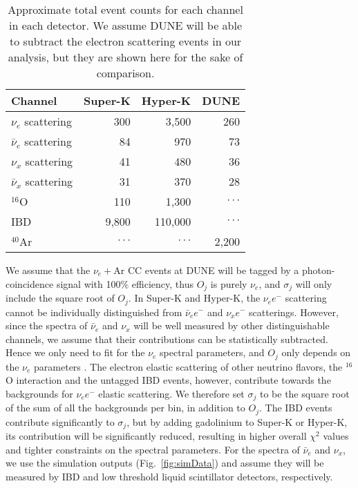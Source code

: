 \documentclass[aps,reprint,superscriptaddress]{revtex4-1}
\begin{document}
\begin{table}
\centering
\begin{tabular}{lrrr}
\hline \hline Channel & Super-K & Hyper-K & DUNE \\ 
\hline $\nu_{e}$ scattering & 300 & 3,500 & 260 \\
 $\bar{\nu}_{e}$ scattering & 84 & 970 & 73 \\
 $\nu_{x}$ scattering & 41 & 480 & 36 \\
 $\bar{\nu}_{x}$ scattering & 31 & 370 & 28 \\
 $^{16}\text{O}$ & 110 & 1,300 & $\cdot\cdot\cdot $\\
 IBD & 9,800 & 110,000 & $\cdot\cdot\cdot$ \\
 $^{40}\text{Ar}$ &$ \cdot\cdot\cdot$ & $\cdot\cdot\cdot$ & 2,200 \\
\hline \hline
\end{tabular}
\caption{Approximate total event counts for each channel in each detector. We assume DUNE will be able to subtract the electron scattering events in our analysis, but they are shown here for the sake of comparison.}
\label{tab:eventCounts}
\end{table}

We assume that the $\nu_e + \text{Ar}$ CC events at DUNE will be tagged by a photon-coincidence signal \cite{Ankowski:2016lab} with 100\% efficiency, thus $O_j$ is purely $\nu_e$, and $\sigma_{j}$ will only include the square root of $O_{j}$.  In Super-K and Hyper-K, the $\nu_{e}e^-$ scattering cannot be individually distinguished from $\bar{\nu}_{e}e^-$ and $\nu_{x}e^-$ scatterings.  However, since the spectra of $\bar{\nu}_e$ and $\nu_x$ will be well measured by other distinguishable channels, we assume that their contributions can be statistically subtracted. Hence we only need to fit for the $\nu_e$ spectral parameters, and $O_j$ only depends on the $\nu_e$ parameters \cite{Laha:2013hva}.  The electron elastic scattering of other neutrino flavors, the $^{16}$O interaction and the untagged IBD events, however, contribute towards the backgrounds for $\nu_{e}e^-$ elastic scattering.  We therefore set $\sigma_{j}$ to be the square root of the sum of all the backgrounds per bin, in addition to $O_{j}$.  The IBD events contribute significantly to $\sigma_{j}$, but by adding gadolinium to Super-K or Hyper-K, its contribution will be significantly reduced, resulting in higher overall $\chi^{2}$ values and tighter constraints on the spectral parameters.  For the spectra of $\bar{\nu}_e$ and $\nu_x$, we use the simulation outputs (Fig.~\ref{fig:simData}) and assume they will be measured by IBD and low threshold liquid scintillator detectors, respectively. 
\end{document}
